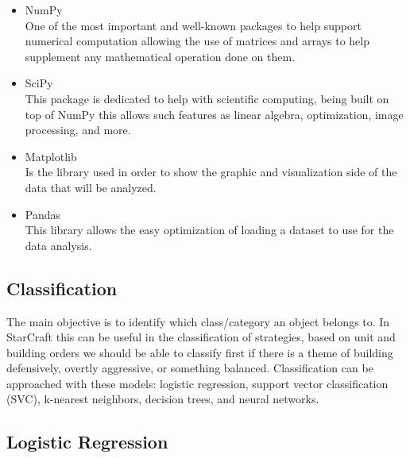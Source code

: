 \documentclass[a4paper,12pt]{report}
\begin{document}
\begin{itemize}[,]
    \setlength\itemsep{-.1cm}
    \item NumPy \\
    One of the most important and well-known packages to help support numerical computation allowing the use of matrices and arrays to help supplement any mathematical operation done on them.
    \item SciPy \\
    This package is dedicated to help with scientific computing, being built on top of NumPy this allows such features as linear algebra, optimization, image processing, and more.
    \item Matplotlib \\
    Is the library used in order to show the graphic and visualization side of the data that will be analyzed.
    \item Pandas \\
    This library allows the easy optimization of loading a dataset to use for the data analysis.
\end{itemize}

\subsection{Classification}

The main objective is to identify which class/category an object belongs to. In StarCraft this can be useful in the classification of strategies, based on unit and building orders we should be able to classify first if there is a theme of building defensively, overtly aggressive, or something balanced. Classification can be approached with these models: logistic regression, support vector classification (SVC), k-nearest neighbors, decision trees, and neural networks.

\subsection{Logistic Regression}
\end{document}
